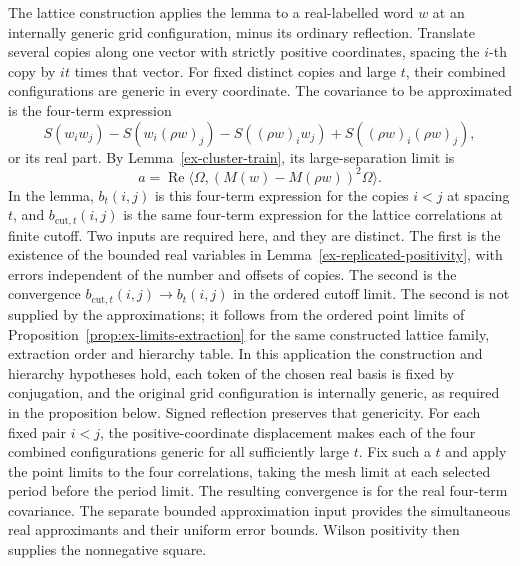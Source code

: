 The lattice construction applies the lemma to a real-labelled word
\(w\) at an internally generic grid configuration, minus its ordinary reflection. Translate several copies along
one vector with strictly positive coordinates, spacing the \(i\)-th
copy by \(it\) times that vector. For fixed distinct copies and large
\(t\), their combined configurations are generic in every coordinate.
The covariance to be approximated is the four-term expression
\[
 S(w_iw_j)-S(w_i(\rho w)_j)
 -S((\rho w)_iw_j)+S((\rho w)_i(\rho w)_j),
\]
or its real part. By Lemma~\ref{ex-cluster-train}, its large-separation
limit is
\begin{equation}\label{ex-reflection-square}
 a=\operatorname{Re}\langle\Omega,
       (M(w)-M(\rho w))^2\Omega\rangle.
\end{equation}
In the lemma, \(b_t(i,j)\) is this four-term expression for the copies
\(i<j\) at spacing \(t\), and \(b_{\mathrm{cut},t}(i,j)\) is the same
four-term expression for the lattice correlations at finite cutoff. Two
inputs are required here, and they are distinct. The first is the existence
of the bounded real variables in Lemma~\ref{ex-replicated-positivity}, with
errors independent of the number and offsets of copies. The second is the
convergence \(b_{\mathrm{cut},t}(i,j)\to b_t(i,j)\) in the ordered cutoff
limit. The second is not supplied by the approximations; it follows from the
ordered point limits of Proposition~\ref{prop:ex-limits-extraction} for the
same constructed lattice family, extraction order and hierarchy table. In
this application the construction and hierarchy hypotheses hold, each token
of the chosen real basis is fixed by conjugation, and the original grid
configuration is internally generic, as required in the proposition below.
Signed reflection preserves that genericity. For each fixed pair \(i<j\),
the positive-coordinate displacement makes each of the four combined
configurations generic for all sufficiently large \(t\). Fix such a \(t\)
and apply the point limits to the four correlations, taking the mesh limit
at each selected period before the period limit. The resulting convergence
is for the real four-term covariance. The separate bounded approximation
input provides the simultaneous real approximants and their uniform error
bounds. Wilson positivity then supplies the nonnegative square.

